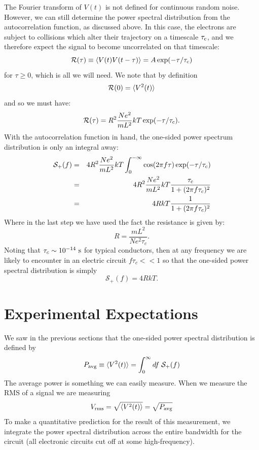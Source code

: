 \documentclass[12pt]{article}
\begin{document}
The Fourier transform of $V(t)$ is not defined for continuous random noise.  However, we can still determine the power spectral distribution from the autocorrelation function, as discussed above.  In this case, the electrons are subject to collisions which alter their trajectory on a timescale $\tau_{\rm c}$, and we therefore expect the signal to become uncorrelated on that timescale:
\begin{displaymath}
\mathcal{R}(\tau) \equiv \braket{V(t) V(t-\tau)} =  A \exp(-\tau/\tau_{\rm c})
\end{displaymath} 
for $\tau \geq 0$, which is all we will need.  We note that by definition
\begin{displaymath}
\mathcal{R}(0) = \braket{V^2(t)} 
\end{displaymath}
and so we must have:
\begin{displaymath}
\mathcal{R}(\tau) = R^2 \frac{N e^2}{m L^2} kT \exp(-\tau/\tau_{\rm c}).
\end{displaymath} 
With the autocorrelation function in hand, the one-sided power spectrum distribution is only an integral away:
\begin{eqnarray*}
\mathcal{S}_{+}(f) &=& 4R^2 \frac{N e^2}{m L^2} kT \int_0^{-\infty}\cos(2\pi f \tau) \exp(-\tau/\tau_{\rm c})\\
 &=& 4R^2 \frac{N e^2}{m L^2} kT \frac{\tau_{\rm c}}{1+(2 \pi f \tau_c)^2} \\
 &=& 4R kT \frac{1}{1+(2 \pi f \tau_c)^2} \\
\end{eqnarray*} 
Where in the last step we have used the fact the resistance is given by:
\begin{displaymath}
R = \frac{m L^2}{N e^2 \tau_c}.
\end{displaymath}
Noting that $\tau_c \sim 10^{-14}~\rm s$ for typical conductors, then at any frequency we are likely to encounter in an electric circuit $f \tau_c << 1$ so that the one-sided power spectral distribution is simply
\begin{equation}
\mathcal{S}_{+}(f) = 4 R k T.
\end{equation}

\section{Experimental Expectations}

We saw in the previous sections that the one-sided power spectral distribution is defined by
\begin{equation}
P_{\rm avg} \equiv \braket{V^2(t)} = \int_{0}^{\infty} df \; \mathcal{S}_+(f) 
\end{equation}
The average power is something we can easily measure.  When we measure the RMS of a signal we are measuring 
\begin{displaymath}
V_{\rm rms} = \sqrt{\braket{V^2(t)}} = \sqrt{P_{\rm avg}}
\end{displaymath}
To make a quantitative prediction for the result of this measurement, we integrate the power spectral distribution across the entire bandwidth for the circuit (all electronic circuits cut off at some high-frequency).
\end{document}
